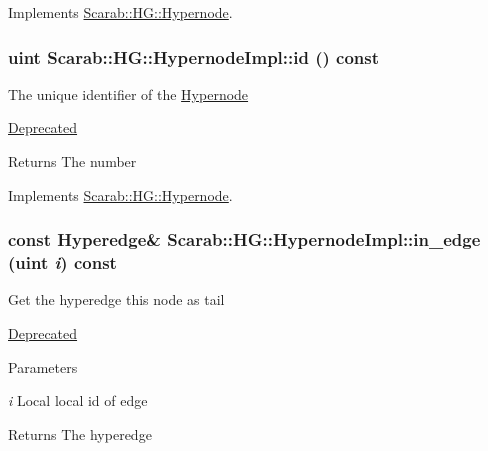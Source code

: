 Implements \hyperlink{classScarab_1_1HG_1_1Hypernode_a3306572ded5b5061c1916bcf268be94e}{Scarab::HG::Hypernode}.

\hypertarget{classScarab_1_1HG_1_1HypernodeImpl_a2579ef1e67ad8f51d23838c130440d21}{
\subsubsection[{id}]{\setlength{\rightskip}{0pt plus 5cm}uint Scarab::HG::HypernodeImpl::id () const}}
\label{classScarab_1_1HG_1_1HypernodeImpl_a2579ef1e67ad8f51d23838c130440d21}
The unique identifier of the \hyperlink{classScarab_1_1HG_1_1Hypernode}{Hypernode} \begin{Desc}
\item[\hyperlink{deprecated__deprecated000006}{Deprecated}]\end{Desc}
\begin{DoxyReturn}{Returns}
The number 
\end{DoxyReturn}


Implements \hyperlink{classScarab_1_1HG_1_1Hypernode_a0aeaee6c2ca2a011fcd086f803aaa4d0}{Scarab::HG::Hypernode}.

\hypertarget{classScarab_1_1HG_1_1HypernodeImpl_a26ff9db30c03c7b74181e9f901aa71d4}{
\subsubsection[{in\_\-edge}]{\setlength{\rightskip}{0pt plus 5cm}const {\bf Hyperedge}\& Scarab::HG::HypernodeImpl::in\_\-edge (uint {\em i}) const}}
\label{classScarab_1_1HG_1_1HypernodeImpl_a26ff9db30c03c7b74181e9f901aa71d4}
Get the hyperedge this node as tail \begin{Desc}
\item[\hyperlink{deprecated__deprecated000010}{Deprecated}]\end{Desc}

\begin{DoxyParams}{Parameters}
\item[{\em i}]Local local id of edge\end{DoxyParams}
\begin{DoxyReturn}{Returns}
The hyperedge 
\end{DoxyReturn}


